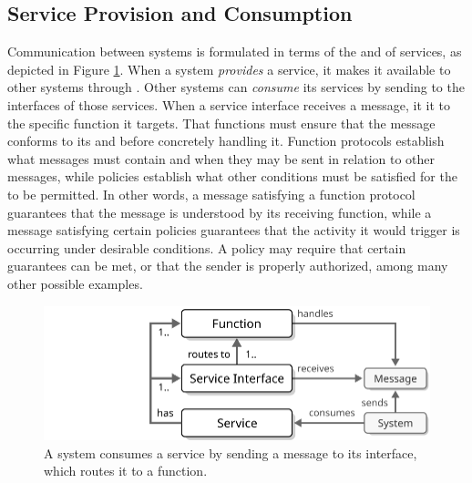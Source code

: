   \vspace*{-3mm}

\subsection{Service Provision and Consumption}

Communication between systems is formulated in terms of the  and  of services, as depicted in Figure \ref{fig:service-consumption}.
When a system \textit{provides} a service, it makes it available to other systems through .
Other systems can \textit{consume} its services by sending  to the interfaces of those services.
When a service interface receives a message, it  it to the specific function it targets.
That functions must ensure that the message conforms to its  and  before concretely handling it.
Function protocols establish what messages must contain and when they may be sent in relation to other messages, while policies establish what other conditions must be satisfied for the  to be permitted.
In other words, a message satisfying a function protocol guarantees that the message is understood by its receiving function, while a message satisfying certain policies guarantees that the activity it would trigger is occurring under desirable conditions.
A policy may require that certain  guarantees can be met, or that the sender is properly authorized, among many other possible examples.

\begin{figure}[ht!]
  \centering
  \includegraphics[scale=0.9]{figures/service-consumption}
  \caption{
    A system consumes a service by sending a message to its interface, which routes it to a function.
  }
  \label{fig:service-consumption}
\end{figure}

